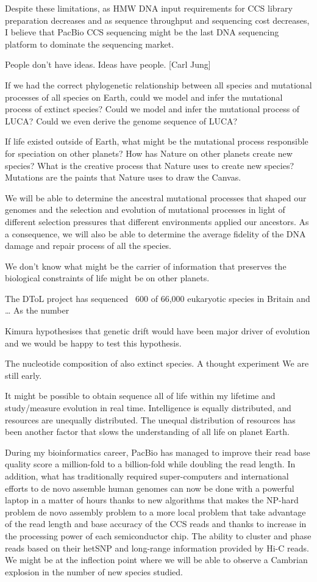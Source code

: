 Despite these limitations, as HMW DNA input requirements for CCS library preparation decreases and as sequence throughput and sequencing cost decreases, I believe that PacBio CCS sequencing might be the last DNA sequencing platform to dominate the sequencing market.

People don't have ideas. Ideas have people. [Carl Jung]


If we had the correct phylogenetic relationship between all species and mutational processes of all species on Earth, could we model and infer the mutational process of extinct species? Could we model and infer the mutational process of LUCA? Could we even derive the genome sequence of LUCA? 

If life existed outside of Earth, what might be the mutational process responsible for speciation on other planets? How has Nature on other planets create new species? What is the creative process that Nature uses to create new species? Mutations are the paints that Nature uses to draw the Canvas. 

We will be able to determine the ancestral mutational processes that shaped our genomes and the selection and evolution of mutational processes in light of different selection pressures that different environments applied our ancestors. As a consequence, we will also be able to determine the average fidelity of the DNA damage and repair process of all the species. 

We don’t know what might be the carrier of information that preserves the biological constraints of life might be on other planets. 

The DToL project has sequenced ~600 of 66,000 eukaryotic species in Britain and … As the number 

Kimura hypothesises that genetic drift would have been major driver of evolution and we would be happy to test this hypothesis. 

The nucleotide composition of also extinct species.
A thought experiment
We are still early.

It might be possible to obtain sequence all of life within my lifetime and study/measure evolution in real time.
Intelligence is equally distributed, and resources are unequally distributed. The unequal distribution of resources has been another factor that slows the understanding of all life on planet Earth. 

During my bioinformatics career, PacBio has managed to improve their read base quality score a million-fold to a billion-fold while doubling the read length. In addition, what has traditionally required super-computers and international efforts to de novo assemble human genomes can now be done with a powerful laptop in a matter of hours thanks to new algorithms that makes the NP-hard problem de novo assembly problem to a more local problem that take advantage of the read length and base accuracy of the CCS reads and thanks to increase in the processing power of each semiconductor chip. The ability to cluster and phase reads based on their hetSNP and long-range information provided by Hi-C reads. We might be at the inflection point where we will be able to observe a Cambrian explosion in the number of new species studied. 

